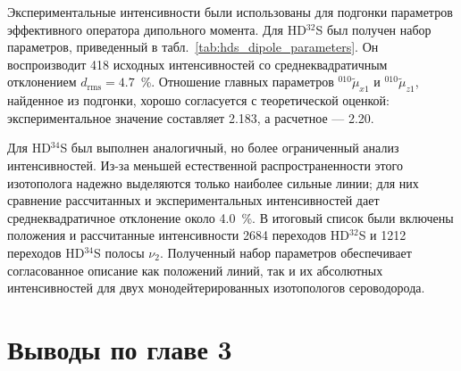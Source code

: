 Экспериментальные интенсивности были использованы для подгонки параметров эффективного оператора
дипольного момента. Для HD$^{32}$S был получен набор параметров, приведенный в
табл.~\ref{tab:hds_dipole_parameters}. Он воспроизводит 418 исходных интенсивностей со
среднеквадратичным отклонением $d_{\textrm{rms}}=4.7$~\%. Отношение главных параметров
${}^{010}\widetilde{\mu}_{x1}$ и ${}^{010}\widetilde{\mu}_{z1}$, найденное из подгонки, хорошо
согласуется с теоретической оценкой: экспериментальное значение составляет 2.183, а расчетное --- 2.20.



Для HD$^{34}$S был выполнен аналогичный, но более ограниченный анализ интенсивностей. Из-за меньшей
естественной распространенности этого изотополога надежно выделяются только наиболее сильные линии;
для них сравнение рассчитанных и экспериментальных интенсивностей дает среднеквадратичное отклонение
около 4.0~\%. В итоговый список были включены положения и рассчитанные интенсивности 2684 переходов
HD$^{32}$S и 1212 переходов HD$^{34}$S полосы $\nu_2$. Полученный набор параметров обеспечивает
согласованное описание как положений линий, так и их абсолютных интенсивностей для двух
монодейтерированных изотопологов сероводорода.

\section*{Выводы по главе 3}

